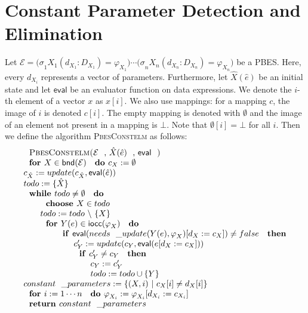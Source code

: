 

\section{Constant Parameter Detection and Elimination}

Let $\mathcal{E=(\sigma }_{1}X_{1}(d_{X_{1}}:D_{X_{1}})=\varphi
_{X_{1}})\cdots \mathcal{(\sigma }_{n}X_{n}(d_{X_{n}}:D_{X_{n}})=\varphi
_{X_{n}})$ be a PBES. Here, every $d_{X_i}$ represents a vector of parameters.
Furthermore, let $\hat{X}(\hat{e})$ be an initial state and let $\mathsf{eval}$
be an evaluator function on data expressions. We denote the $i$-th element
of a vector $x$ as $x[i]$. We also use mappings: for a mapping $c$, the image of
$i$ is denoted $c[i]$. The empty mapping is denoted with $\emptyset$ and the
image of an element not present in a mapping is $\bot$. Note that
$\emptyset[i] = \bot$ for all $i$. Then we define the algorithm
\textsc{PbesConstelm} as follows:$\qquad \qquad $%
\begin{equation*}
\begin{array}{l}
\text{\textsc{PbesConstelm(}}\mathcal{E}\text{, }\hat{X}(\hat{e}) \text{, }
\mathsf{eval}\text{\textsc{)}} \\
\text{\textbf{for }}X\in \mathsf{bnd}(\mathcal{E)}\text{ \textbf{do }}%
c_{X}:=\emptyset  \\
c_{\hat{X}}:=update(c_{\hat{X}},\mathsf{eval}(\hat{e})) \\
todo:= \{\hat{X}\} \\
\text{\textbf{while }}todo\neq \emptyset \text{ \textbf{do}} \\
\qquad \text{\textbf{choose }}X\in todo \\
\qquad todo:=todo\ \backslash \ \{X\} \\
\qquad \text{\textbf{for }}Y(e)\in \mathsf{iocc}(\varphi _{X}\mathcal{)}%
\text{ \textbf{do}} \\
\qquad \qquad \text{\textbf{if }}\mathsf{eval}(needs\_update(Y(e),\varphi
_{X})[d_{X}:=c_{X}])\neq false\text{ \textbf{then}} \\
\qquad \qquad \qquad c_{Y}^{\prime }:=update(c_{Y},\mathsf{eval}%
(e[d_{X}:=c_{X}])) \\
\qquad \qquad \qquad \text{\textbf{if }}c_{Y}^{\prime }\neq c_{Y}\text{
	\textbf{then}} \\
\qquad \qquad \qquad \qquad c_{Y}:=c_{Y}^{\prime } \\
\qquad \qquad \qquad \qquad todo:=todo\cup \{Y\} \\
constant\_parameters:=\{(X,i)\ |\ c_{X}[i]\neq d_{X}[i]\} \\
\text{\textbf{for }}i:=1\cdots n\text{ \textbf{do }}\varphi
_{X_{i}}:=\varphi _{X_{i}}[d_{X_{i}}:=c_{X_{i}}] \\
\text{\textbf{return }}constant\_parameters%
\end{array}%
\end{equation*}

